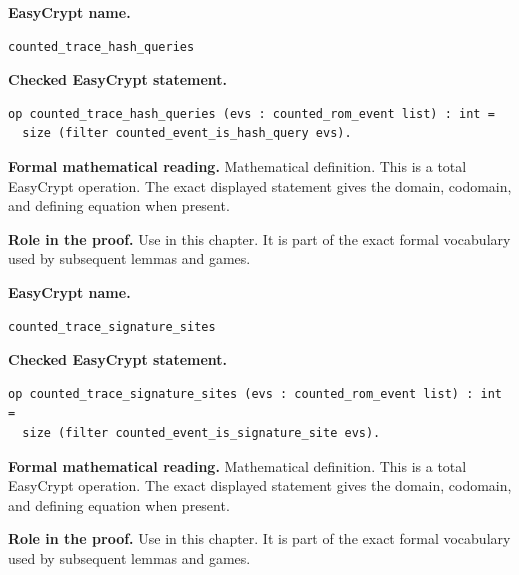 \begin{formaldefinition}
\noindent\textbf{EasyCrypt name.}
\begin{lstlisting}[language=EasyCrypt,basicstyle=\ttfamily\scriptsize]
counted_trace_hash_queries
\end{lstlisting}
\noindent\textbf{Checked EasyCrypt statement.}
\begin{lstlisting}[language=EasyCrypt,basicstyle=\ttfamily\scriptsize]
op counted_trace_hash_queries (evs : counted_rom_event list) : int =
  size (filter counted_event_is_hash_query evs).
\end{lstlisting}
\noindent\textbf{Formal mathematical reading.}
Mathematical definition. This is a total EasyCrypt operation.  The exact displayed statement gives the domain, codomain, and defining equation when present.

\noindent\textbf{Role in the proof.}
Use in this chapter. It is part of the exact formal vocabulary used by subsequent lemmas and games.

\end{formaldefinition}

\begin{formaldefinition}
\noindent\textbf{EasyCrypt name.}
\begin{lstlisting}[language=EasyCrypt,basicstyle=\ttfamily\scriptsize]
counted_trace_signature_sites
\end{lstlisting}
\noindent\textbf{Checked EasyCrypt statement.}
\begin{lstlisting}[language=EasyCrypt,basicstyle=\ttfamily\scriptsize]
op counted_trace_signature_sites (evs : counted_rom_event list) : int =
  size (filter counted_event_is_signature_site evs).
\end{lstlisting}
\noindent\textbf{Formal mathematical reading.}
Mathematical definition. This is a total EasyCrypt operation.  The exact displayed statement gives the domain, codomain, and defining equation when present.

\noindent\textbf{Role in the proof.}
Use in this chapter. It is part of the exact formal vocabulary used by subsequent lemmas and games.

\end{formaldefinition}

